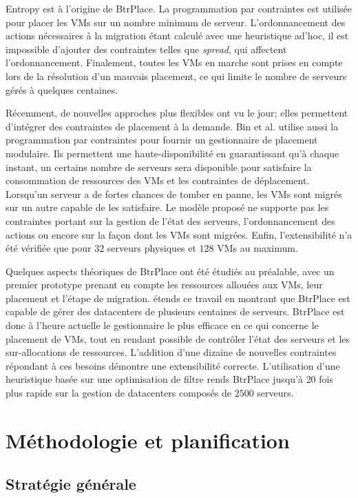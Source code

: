 \documentclass[a4paper]{article}
\begin{document}
Entropy est à l'origine de BtrPlace. La programmation par contraintes
est utilisée pour placer les VMs sur un nombre minimum de serveur.
L'ordonnancement des actions nécessaires à la migration étant calculé
avec une heuristique ad'hoc, il est impossible d'ajouter des
contraintes telles que \textit{spread}, qui affectent l'ordonnancement.
Finalement, toutes les VMs en marche sont prises en compte lors
de la résolution d'un mauvais placement, ce qui limite le nombre
de serveurs gérés à quelques centaines.

Récemment, de nouvelles approches plus flexibles ont vu le jour;
elles permettent d'intégrer des contraintes de placement à la
demande. Bin et al. utilise aussi la programmation par contraintes
pour fournir un gestionnaire de placement modulaire. Ils
permettent une haute-disponibilité en guarantissant qu'à chaque instant,
un certains nombre de serveurs sera disponible pour satisfaire
la consommation de ressources des VMs et les contraintes de
déplacement. Lorsqu'un serveur a de fortes chances de tomber en panne,
les VMs sont migrés sur un autre capable de les satisfaire. Le modèle
proposé ne supporte pas les contraintes portant sur la gestion de
l'état des serveurs, l'ordonnancement des actions ou encore sur la
façon dont les VMs sont migrées. Enfin, l'extensibilité n'a été
vérifiée que pour $32$ serveurs physiques et $128$ VMs au maximum.

Quelques aspects théoriques de BtrPlace ont été étudiés au préalable,
avec un premier prototype prenant en compte les ressources allouées
aux VMs, leur placement et l'étape de migration. \cite{herm2012}
étends ce travail en montrant que BtrPlace est capable de gérer
des datacenters de plusieurs centaines de serveurs. BtrPlace
est donc à l'heure actuelle le gestionnaire le plus efficace en
ce qui concerne le placement de VMs, tout en rendant possible
de contrôler l'état des serveurs et les sur-allocations de ressources.
L'addition d'une dizaine de nouvelles contraintes répondant à
ces besoins démontre une extensibilité correcte. L'utilisation
d'une heuristique basée sur une optimisation de filtre
rends BtrPlace jusqu'à $20$ fois plus rapide sur la gestion de
datacenters composés de $2500$ serveurs.

\section{Méthodologie et planification}
\subsection{Stratégie générale}
\end{document}
